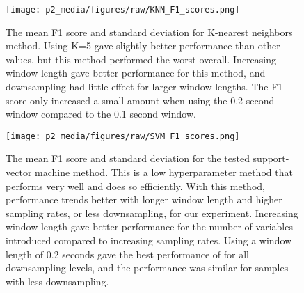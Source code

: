 
\begin{figure}[t!]
\centering
\texttt{[image: p2\_media/figures/raw/KNN\_F1\_scores.png]}
\caption{The mean F1 score and standard deviation for K-nearest neighbors method. 
Using K=5 gave slightly better performance than other values, 
but this method performed the worst overall.
Increasing window length gave better performance for this method, and downsampling had little effect
for larger window lengths. 
The F1 score only increased a small amount when using the 0.2 second window compared to the 0.1 second window.
}
\label{fig:perf_KNN}
\end{figure}

\begin{figure}[t!]
\centering
\texttt{[image: p2\_media/figures/raw/SVM\_F1\_scores.png]}
\caption{The mean F1 score and standard deviation for the tested support-vector machine method.
This is a low hyperparameter method that performs very well and does so efficiently.
With this method, performance trends better with longer window length 
and higher sampling rates, or less downsampling, for our experiment.
Increasing window length gave better performance for the number of variables introduced
compared to increasing sampling rates.
Using a window length of 0.2 seconds gave the best performance of for all downsampling levels,
and the performance was similar for samples with less downsampling.
}
\label{fig:perf_SVM}
\end{figure}

